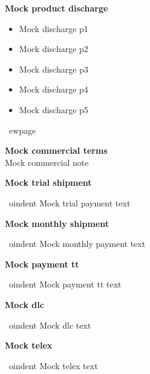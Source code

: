 \documentclass[a4paper,11pt]{article}
\begin{document}
\vspace{0.3cm}

\begin{center}{\large\textbf{\color{marooncolor}Mock product discharge}}\end{center}
\vspace{0.1cm}
\begin{itemize}[leftmargin=1.5em, itemsep=2pt, topsep=2pt]
\item Mock discharge p1
\item Mock discharge p2
\item Mock discharge p3
\item Mock discharge p4
\item Mock discharge p5
\end{itemize}

\
ewpage

\begin{center}
  {\large\textbf{\color{marooncolor}Mock commercial terms}}\\[4pt]
  {\small\color{marooncolor}Mock commercial note}
\end{center}
\vspace{0.2cm}

\begin{center}{\large\textbf{\color{marooncolor}Mock trial shipment}}\end{center}
\vspace{0.1cm}
\
oindent Mock trial payment text

\vspace{0.3cm}
\begin{center}{\large\textbf{\color{marooncolor}Mock monthly shipment}}\end{center}
\vspace{0.1cm}
\
oindent Mock monthly payment text

\vspace{0.3cm}
\begin{center}{\large\textbf{\color{marooncolor}Mock payment tt}}\end{center}
\vspace{0.1cm}
\
oindent Mock payment tt text

\vspace{0.3cm}
\begin{center}{\large\textbf{\color{marooncolor}Mock dlc}}\end{center}
\vspace{0.1cm}
\
oindent Mock dlc text

\vspace{0.3cm}
\begin{center}{\large\textbf{\color{marooncolor}Mock telex}}\end{center}
\vspace{0.1cm}
\
oindent Mock telex text
\end{document}
